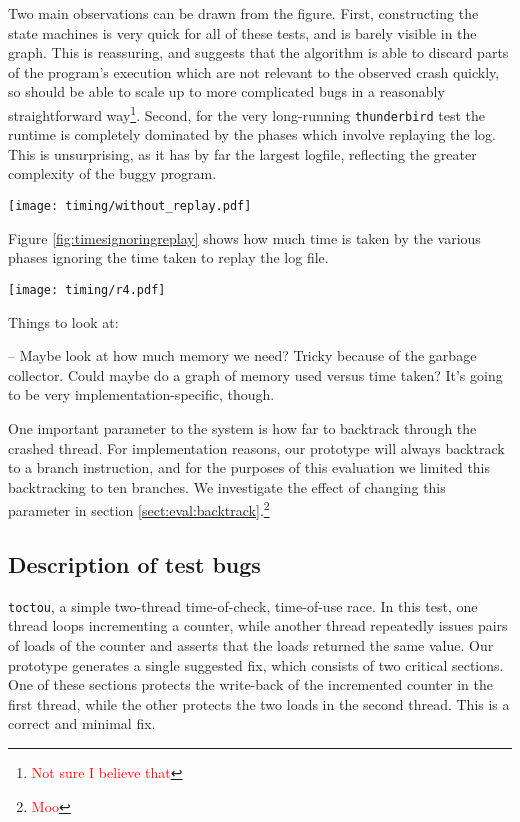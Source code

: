 \documentclass[10pt,twocolumn,preprint,natbib,authoryear]{sigplanconf}
\newcommand{\editorial}[1]{\textcolor{red}{\footnote{\textcolor{red}{#1}}}}
\begin{document}
Two main observations can be drawn from the figure.  First,
constructing the state machines is very quick for all of these tests,
and is barely visible in the graph.  This is reassuring, and suggests
that the algorithm is able to discard parts of the program's execution
which are not relevant to the observed crash quickly, so should be
able to scale up to more complicated bugs in a reasonably
straightforward way\editorial{Not sure I believe that}.  Second, for
the very long-running \verb|thunderbird| test the runtime is
completely dominated by the phases which involve replaying the log.
This is unsurprising, as it has by far the largest logfile, reflecting
the greater complexity of the buggy program.

\begin{figure*}
\texttt{[image: timing/without\_replay.pdf]}
\caption{Break down of how long the phases take, ignoring time spent
  in the replay engine.  Mean and standard deviation from five runs on
  a single log file for each bug.}
\label{fig:timesignoringreplay}
\end{figure*}

Figure \ref{fig:timesignoringreplay} shows how much time is taken by
the various phases ignoring the time taken to replay the log file.


\begin{figure*}
\texttt{[image: timing/r4.pdf]}
\caption{Breakdown of the phases from running the fixer on five instances
  of the glibc test bug.}
\label{fig:r4}
\end{figure*}

Things to look at:

-- Maybe look at how much memory we need?  Tricky because of the
garbage collector.  Could maybe do a graph of memory used versus time
taken?  It's going to be very implementation-specific, though.

One important parameter to the system is how far to backtrack through
the crashed thread.  For implementation reasons, our prototype will
always backtrack to a branch instruction, and for the purposes of this
evaluation we limited this backtracking to ten branches.  We
investigate the effect of changing this parameter in section
\ref{sect:eval:backtrack}.\editorial{Moo}

\subsection{Description of test bugs}

\verb|toctou|, a simple two-thread time-of-check, time-of-use race.
In this test, one thread loops incrementing a counter, while another
thread repeatedly issues pairs of loads of the counter and asserts
that the loads returned the same value.  Our prototype generates a
single suggested fix, which consists of two critical sections.  One of
these sections protects the write-back of the incremented counter in
the first thread, while the other protects the two loads in the second
thread.  This is a correct and minimal fix.
\end{document}
